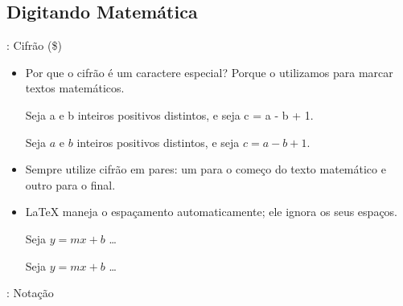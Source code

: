 \documentclass{beamer}
\begin{document}
\subsection{Digitando Matemática}
\begin{frame}[fragile]{\insertsubsection{}: Cifrão (\$)}
\begin{itemize}
  \item Por que o cifrão  \keystrokebftt{\$} é um caractere especial? Porque o utilizamos para marcar textos matemáticos.\\[1ex]
  \begin{exampletwouptiny}
Seja a e b inteiros positivos
distintos, e seja
c = a - b + 1.

Seja $a$ e $b$ inteiros positivos
distintos, e seja
$c = a - b + 1$.
  \end{exampletwouptiny}
  \item Sempre utilize cifrão em pares: um para o começo do texto matemático e outro para o final.
  \item \LaTeX{} maneja o espaçamento automaticamente; ele ignora os seus espaços.
  \begin{exampletwouptiny}
Seja $y=mx+b$  \ldots

Seja $y = m x + b$  \ldots
  \end{exampletwouptiny}
\end{itemize}
\end{frame}

\begin{frame}[fragile]{\insertsubsection{}: Notação}
\end{frame}
\end{document}
